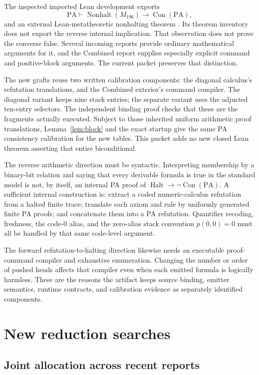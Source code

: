 \documentclass[11pt,letterpaper]{article}
\newcommand{\PA}{\mathrm{PA}}
\newcommand{\Con}{\operatorname{Con}}
\newcommand{\Halt}{\operatorname{Halt}}
\newcommand{\NH}{\operatorname{Nonhalt}}
\begin{document}
The inspected imported Lean development exports
\[
             \PA\vdash\NH(M_{196})\to\Con(\PA),
\]
and an external Lean-metatheoretic nonhalting theorem \cite{inventory}.
Its theorem inventory does not export the reverse internal implication.
That observation does not prove the converse false. Several incoming
reports provide ordinary mathematical arguments for it, and the Combined
report supplies especially explicit command and positive-block arguments.
The current packet preserves that distinction.

The new grafts reuse two written calibration components: the diagonal
calculus's refutation translations, and the Combined exterior's command
compiler. The diagonal variant keeps nine stack entries; the separate
variant uses the adjusted ten-entry selectors. The independent binding
proof checks that these are the fragments actually executed. Subject to
those inherited uniform arithmetic proof translations, Lemma~\ref{lem:block}
and the exact startup give the same PA consistency calibration for the
new tables. This packet adds no new closed Lean theorem asserting that
entire biconditional.

The reverse arithmetic direction must be syntactic. Interpreting
membership by a binary-bit relation and saying that every derivable
formula is true in the standard model is not, by itself, an internal PA
proof of $\Halt\to\neg\Con(\PA)$. A sufficient internal construction is:
extract a coded numeric-calculus refutation from a halted finite trace;
translate each axiom and rule by uniformly generated finite PA proofs;
and concatenate them into a PA refutation. Quantifier recoding, freshness,
the code-0 alias, and the zero-alias stack convention $p(0,0)=0$ must all
be handled by that same code-level argument.

The forward refutation-to-halting direction likewise needs an executable
proof-command compiler and exhaustive enumeration. Changing the number
or order of pushed heads affects that compiler even when each emitted
formula is logically harmless. These are the reasons the artifact keeps
source binding, emitter semantics, runtime contracts, and calibration
evidence as separately identified components.

\section{New reduction searches}
\subsection{Joint allocation across recent reports}
\end{document}
